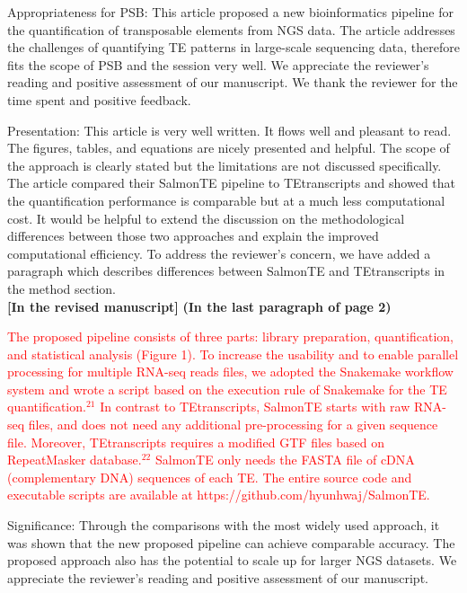 \documentclass[10pt]{article}
\begin{document}
\begin{response}{Appropriateness for PSB: This article proposed a new bioinformatics pipeline for the quantification of transposable elements from NGS data. The article addresses the challenges of quantifying TE patterns in large-scale sequencing data, therefore fits the scope of PSB and the session very well.}
We appreciate the reviewer's reading and positive assessment of our manuscript.
We thank the reviewer for the time spent and positive feedback.
\end{response}
\begin{response}{Presentation: This article is very well written. It flows well and pleasant to read. The figures, tables, and equations are nicely presented and helpful. The scope of the approach is clearly stated but the limitations are not discussed specifically. The article compared their SalmonTE pipeline to TEtranscripts and showed that the quantification performance is comparable but at a much less computational cost. 
It would be helpful to extend the discussion on the methodological differences between those two approaches and explain the improved computational efficiency.}
To address the reviewer's concern, we have added a paragraph which describes differences between SalmonTE and TEtranscripts in the method section.
\\

\textbf{[In the revised manuscript]} 
\textbf{(In the last paragraph of page 2)} 

\textcolor{red}{
The proposed pipeline consists of three parts: library preparation, quantification, and statistical analysis (Figure 1). To increase the usability and to enable parallel processing for multiple RNA-seq reads files, we adopted the Snakemake workflow system and wrote a script based on the execution rule of Snakemake for the TE quantification.$^{21}$ In contrast to TEtranscripts, SalmonTE starts with raw RNA-seq files, and does not need any additional pre-processing for a given sequence file. Moreover, TEtranscripts requires a modified GTF files based on RepeatMasker database.$^{22}$ SalmonTE only needs the FASTA file of cDNA (complementary DNA) sequences of each TE. The entire source code and executable scripts are available at https://github.com/hyunhwaj/SalmonTE.}

\end{response}
\begin{response}{Significance: Through the comparisons with the most widely used approach, it was shown that the new proposed pipeline can achieve comparable accuracy. The proposed approach also has the potential to scale up for larger NGS datasets.}
We appreciate the reviewer's reading and positive assessment of our manuscript.
\end{response}
\end{document}
